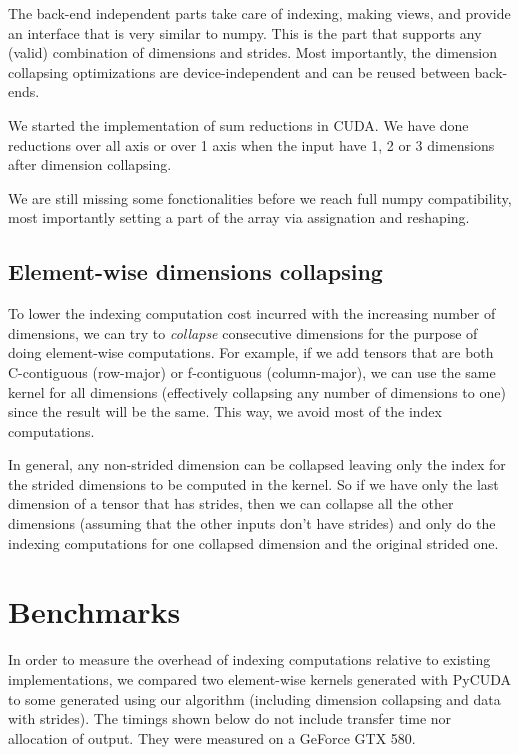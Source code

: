 \documentclass{article} %
\begin{document}
The back-end independent parts take care of indexing, making views, and provide an interface that is very similar to numpy.
This is the part that supports any (valid) combination of dimensions and strides.
Most importantly, the dimension collapsing optimizations are device-independent and can be reused between back-ends.

We started the implementation of sum reductions in CUDA.
We have done reductions over all axis or over 1 axis when the input have 1, 2 or 3 dimensions after dimension collapsing.

We are still missing some fonctionalities before we reach full numpy compatibility, most importantly setting a part of the array via assignation and reshaping.

\subsection{Element-wise dimensions collapsing}

To lower the indexing computation cost incurred with the increasing number of dimensions, we can try to \emph{collapse} consecutive dimensions for the purpose of doing element-wise computations.
For example, if we add tensors that are both C-contiguous (row-major) or f-contiguous (column-major), we can use the same kernel for all dimensions (effectively collapsing any number of dimensions to one) since the result will be the same.
This way,  we avoid most of the index computations.

In general, any non-strided dimension can be collapsed leaving only the index for the strided dimensions to be computed in the kernel.
So if we have only the last dimension of a tensor that has strides, then we can collapse all the other dimensions (assuming that the other inputs don't have strides) and only do the indexing computations for one collapsed dimension and the original strided one.

\section{Benchmarks}

In order to measure the overhead of indexing computations relative to existing implementations, we compared two element-wise kernels generated with PyCUDA to some generated using our algorithm (including dimension collapsing and data with strides).
The timings shown below do not include transfer time nor allocation of output.
They were measured on a GeForce GTX 580.
\end{document}
